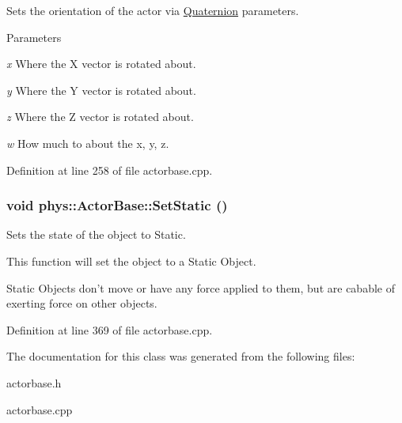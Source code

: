 Sets the orientation of the actor via \hyperlink{classphys_1_1Quaternion}{Quaternion} parameters. 
\begin{DoxyParams}{Parameters}
\item[{\em x}]Where the X vector is rotated about. \item[{\em y}]Where the Y vector is rotated about. \item[{\em z}]Where the Z vector is rotated about. \item[{\em w}]How much to about the x, y, z. \end{DoxyParams}


Definition at line 258 of file actorbase.cpp.

\hypertarget{classphys_1_1ActorBase_af0219532fe71d1d84042a20a88fe5037}{
\subsubsection[{SetStatic}]{\setlength{\rightskip}{0pt plus 5cm}void phys::ActorBase::SetStatic ()}}
\label{d8/d0f/classphys_1_1ActorBase_af0219532fe71d1d84042a20a88fe5037}


Sets the state of the object to Static. 

This function will set the object to a Static Object. \par
 Static Objects don't move or have any force applied to them, but are cabable of exerting force on other objects. 

Definition at line 369 of file actorbase.cpp.



The documentation for this class was generated from the following files:\begin{DoxyCompactItemize}
\item 
actorbase.h\item 
actorbase.cpp\end{DoxyCompactItemize}
